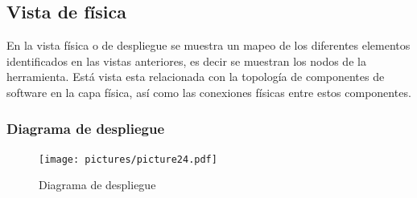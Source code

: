 \newpage
\subsection{Vista de física}

En la vista física o de despliegue se muestra un mapeo de los diferentes elementos identificados en las vistas anteriores, es decir se muestran los nodos de la herramienta. Está vista esta relacionada con la topología de componentes de software en la capa física, así como las conexiones físicas entre estos componentes.

\subsubsection{Diagrama de despliegue}

\begin{figure}[H]
\centering
\texttt{[image: pictures/picture24.pdf]}
\caption{Diagrama de despliegue}
\end{figure}
